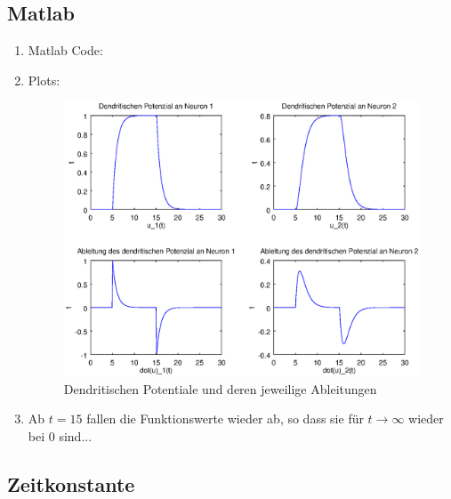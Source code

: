 \documentclass[DIN, pagenumber=false, fontsize=11pt, parskip=half]{scrartcl}
\begin{document}
    \subsection{Matlab}
    \begin{enumerate}[label=(\alph*)]
        \item Matlab Code:
            
        
        \item Plots:
            \begin{figure}[H]
                \centering
                \includegraphics[trim = 0 0 10 10,width=\textwidth]{Plot}
                \caption{Dendritischen Potentiale und deren jeweilige Ableitungen}
            \end{figure} 

        \item Ab $t=15$ fallen die Funktionswerte wieder ab, so dass sie für $t \to \infty$ wieder bei $0$ sind...
    \end{enumerate}

    \subsection{Zeitkonstante}
\end{document}
